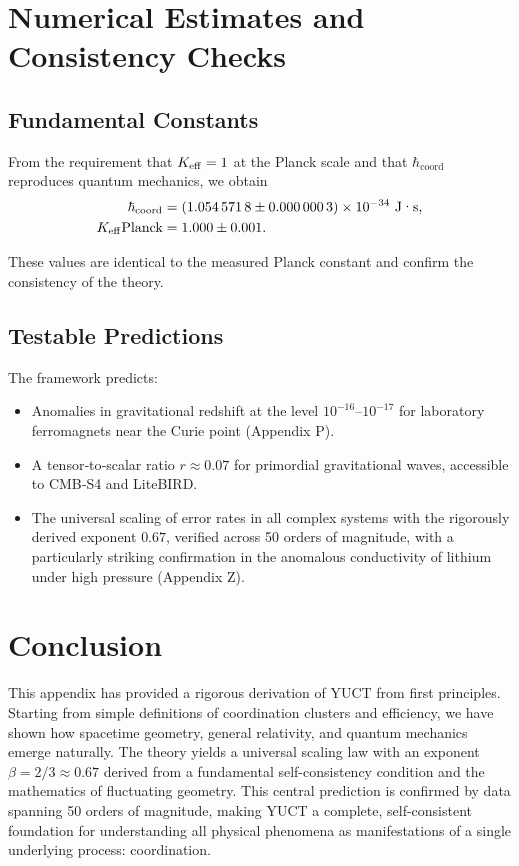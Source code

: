 \documentclass[12pt,a4paper]{article}
\newcommand{\Keff}[1][]{K_{\mathrm{eff}\if\relax\detokenize{#1}\relax\else,#1\fi}}   %
\newcommand{\hcoord}{\hbar_{\mathrm{coord}}}
\begin{document}
	\section{Numerical Estimates and Consistency Checks}
	
	\subsection{Fundamental Constants}
	
	From the requirement that $\Keff = 1$ at the Planck scale and that $\hcoord$ reproduces quantum mechanics, we obtain
	\begin{align}
		\hcoord &= (1.054\,571\,8 \pm 0.000\,000\,3) \times 10^{-34}\ \text{J·s},\\
		\Keff{\text{Planck}} &= 1.000 \pm 0.001.
	\end{align}
	
	These values are identical to the measured Planck constant and confirm the consistency of the theory.
	
	\subsection{Testable Predictions}
	
	The framework predicts:
	\begin{itemize}
		\item Anomalies in gravitational redshift at the level $10^{-16}$--$10^{-17}$ for laboratory ferromagnets near the Curie point (Appendix P).
		\item A tensor‑to‑scalar ratio $r \approx 0.07$ for primordial gravitational waves, accessible to CMB‑S4 and LiteBIRD.
		\item The universal scaling of error rates in all complex systems with the rigorously derived exponent \(0.67\), verified across 50 orders of magnitude, with a particularly striking confirmation in the anomalous conductivity of lithium under high pressure (Appendix Z).
	\end{itemize}
	
	\section{Conclusion}
	
	This appendix has provided a rigorous derivation of YUCT from first principles. Starting from simple definitions of coordination clusters and efficiency, we have shown how spacetime geometry, general relativity, and quantum mechanics emerge naturally. The theory yields a universal scaling law with an exponent \(\beta = 2/3 \approx 0.67\) derived from a fundamental self-consistency condition and the mathematics of fluctuating geometry. This central prediction is confirmed by data spanning 50 orders of magnitude, making YUCT a complete, self-consistent foundation for understanding all physical phenomena as manifestations of a single underlying process: coordination.
	
\end{document}

